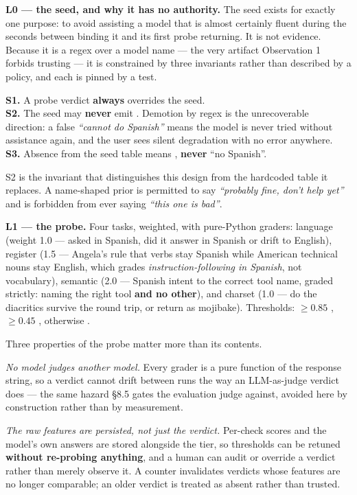 \textbf{L0 --- the seed, and why it has no authority.} The seed exists for
exactly one purpose: to avoid assisting a model that is almost certainly fluent
during the seconds between binding it and its first probe returning. It is not
evidence. Because it is a regex over a model name --- the very artifact
Observation 1 forbids trusting --- it is constrained by three invariants rather
than described by a policy, and each is pinned by a test.

\begin{keyinsight}
\textbf{S1.} A probe verdict \textbf{always} overrides the seed.\\
\textbf{S2.} The seed may \textbf{never} emit . Demotion by regex is
the unrecoverable direction: a false \emph{``cannot do Spanish''} means the
model is never tried without assistance again, and the user sees silent
degradation with no error anywhere.\\
\textbf{S3.} Absence from the seed table means , \textbf{never}
``no Spanish''.
\end{keyinsight}

S2 is the invariant that distinguishes this design from the hardcoded table it
replaces. A name-shaped prior is permitted to say \emph{``probably fine, don't
help yet''} and is forbidden from ever saying \emph{``this one is bad''}.

\textbf{L1 --- the probe.} Four tasks, weighted, with pure-Python graders:
language (weight 1.0 --- asked in Spanish, did it answer in Spanish or drift to
English), register (1.5 --- Angela's rule that verbs stay Spanish while American
technical nouns stay English, which grades \emph{instruction-following in
Spanish}, not vocabulary), semantic (2.0 --- Spanish intent to the correct tool
name, graded strictly: naming the right tool \textbf{and no other}), and charset
(1.0 --- do the diacritics survive the round trip, or return as mojibake).
Thresholds: $\geq 0.85$ \textrightarrow{} ,
$\geq 0.45$ \textrightarrow{} , otherwise .

Three properties of the probe matter more than its contents.

\emph{No model judges another model.} Every grader is a pure function of the
response string, so a verdict cannot drift between runs the way an
LLM-as-judge verdict does --- the same hazard \S8.5 gates the evaluation judge
against, avoided here by construction rather than by measurement.

\emph{The raw features are persisted, not just the verdict.} Per-check scores
and the model's own answers are stored alongside the tier, so thresholds can be
retuned \textbf{without re-probing anything}, and a human can audit or override
a verdict rather than merely observe it. A  counter
invalidates verdicts whose features are no longer comparable; an older verdict
is treated as absent rather than trusted.

